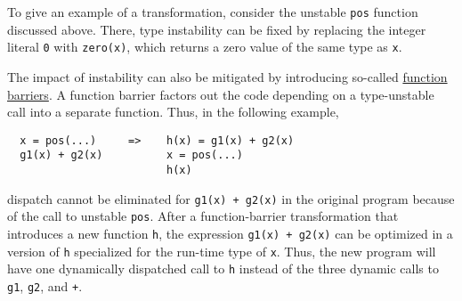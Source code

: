 \documentclass[twocolumn]{article}
\begin{document}
To give an example of a transformation, consider the unstable
\texttt{pos} function discussed above. There, type instability can be
fixed by replacing the integer literal \texttt{0} with \texttt{zero(x)},
which returns a zero value of the same type as \texttt{x}.

The impact of instability can also be mitigated by introducing so-called
\href{https://docs.julialang.org/en/v1/manual/performance-tips/#kernel-functions}{function barriers}.
A function barrier factors out the code
depending on a type-unstable call into a separate function. Thus, in the
following example,
\begin{verbatim}
  x = pos(...)     =>    h(x) = g1(x) + g2(x)
  g1(x) + g2(x)          x = pos(...)
                         h(x)
\end{verbatim}
dispatch cannot be eliminated for \texttt{g1(x)\ +\ g2(x)} in the
original program because of the call to unstable \texttt{pos}. After a
function-barrier transformation that introduces a new function
\texttt{h}, the expression \texttt{g1(x)\ +\ g2(x)} can be optimized in
a version of \texttt{h} specialized for the run-time type of \texttt{x}.
Thus, the new program will have one dynamically dispatched call to
\texttt{h} instead of the three dynamic calls to \texttt{g1},
\texttt{g2}, and \texttt{+}.


\vspace*{-2em}


\end{document}
